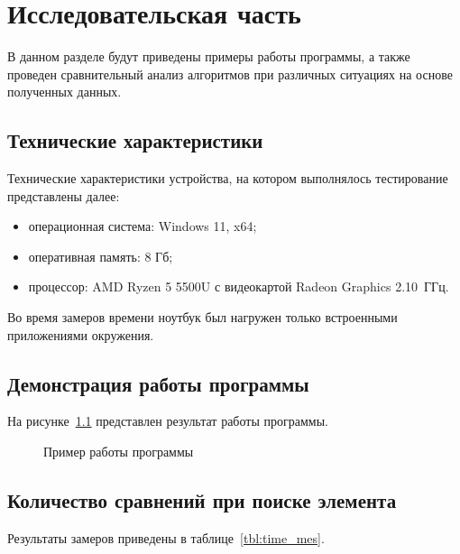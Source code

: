 \chapter{Исследовательская часть}

В данном разделе будут приведены примеры работы программы, а также проведен сравнительный анализ алгоритмов при различных ситуациях на основе полученных данных.

\section{Технические характеристики}

Технические характеристики устройства, на котором выполнялось тестирование представлены далее:
\begin{itemize}[label={---}]
	\item операционная система: Windows 11, x64;
	\item оперативная память: 8 Гб;
	\item процессор: AMD Ryzen 5 5500U с видеокартой Radeon Graphics 2.10~ГГц.
\end{itemize}

Во время замеров времени ноутбук был нагружен только встроенными приложениями окружения.

\section{Демонстрация работы программы}

На рисунке~\ref{img:run} представлен результат работы программы.

\begin{figure}[H]
	\caption{Пример работы программы}
	\label{img:run}
\end{figure}
\clearpage

\section{Количество сравнений при поиске элемента}

Результаты замеров приведены в таблице~\ref{tbl:time_mes}.

